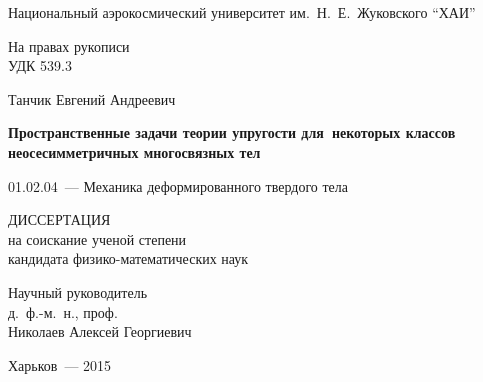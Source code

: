 \documentclass[book,14pt,small,oneside]{ncc}
\begin{document}
\indentaftersection
{}

\begin{titlepage}
\begin{center}
Национальный аэрокосмический университет им.~Н.~Е.~Жуковского ``ХАИ''
\end{center}
\vskip1cm
\begin{flushright}
На правах рукописи \\
УДК 539.3
\end{flushright}
\vskip2cm
\begin{center}
\large Танчик Евгений Андреевич
\end{center}
\vskip1cm
\begin{center}
\huge\bf Пространственные задачи теории упругости для~некоторых классов неосесимметричных многосвязных тел
\end{center}
\vskip1cm
\begin{center}
01.02.04~--- Механика деформированного твердого тела
\end{center}
\vskip1cm
\begin{center}
ДИССЕРТАЦИЯ \\
на соискание ученой степени \\
кандидата физико-математических наук
\end{center}
\vskip2cm
\begin{flushright}
Научный руководитель \\
д.~ф.-м.~н., проф. \\
Николаев Алексей Георгиевич
\end{flushright}
\vskip2cm
\begin{center}
Харьков~--- 2015
\end{center}
\end{titlepage}
\tableofcontents






%


\end{document}
